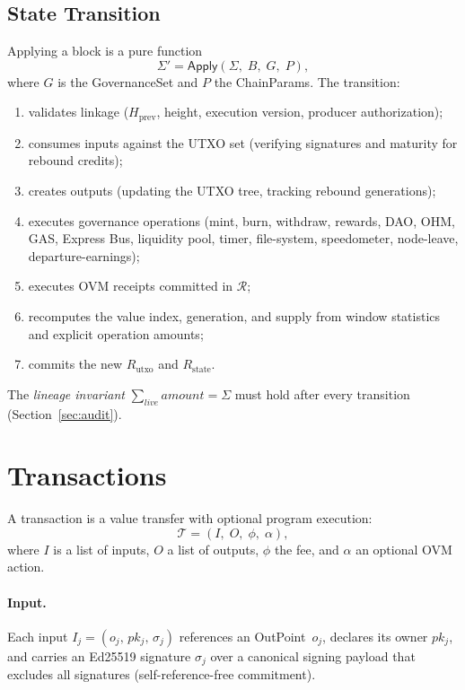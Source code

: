 \documentclass[11pt,a4paper]{article}
\theoremstyle{definition}
\newcommand{\outpoint}{\textsf{OutPoint}}
\begin{document}
\subsection{State Transition}

Applying a block is a pure function
\[
\Sigma' = \mathsf{Apply}(\Sigma,\; B,\; G,\; P),
\]
where $G$ is the GovernanceSet and $P$ the ChainParams.  The transition:
\begin{enumerate}[label=(\arabic*),leftmargin=2em]
  \item validates linkage ($H_{\mathrm{prev}}$, height, execution version,
    producer authorization);
  \item consumes inputs against the UTXO set (verifying signatures and
    maturity for rebound credits);
  \item creates outputs (updating the UTXO tree, tracking rebound generations);
  \item executes governance operations (mint, burn, withdraw, rewards, DAO,
    OHM, GAS, Express Bus, liquidity pool, timer, file-system, speedometer,
    node-leave, departure-earnings);
  \item executes OVM receipts committed in $\mathcal{R}$;
  \item recomputes the value index, generation, and supply from window
    statistics and explicit operation amounts;
  \item commits the new $R_{\mathrm{utxo}}$ and $R_{\mathrm{state}}$.
\end{enumerate}
The \emph{lineage invariant} $\sum_{\mathit{live}} \mathit{amount} = \Sigma$
must hold after every transition (Section~\ref{sec:audit}).

\section{Transactions}
\label{sec:tx}

A transaction is a value transfer with optional program execution:
\[
\mathcal{T} = (I,\; O,\; \phi,\; \alpha),
\]
where $I$ is a list of inputs, $O$ a list of outputs, $\phi$ the fee, and
$\alpha$ an optional OVM action.

\paragraph{Input.} Each input $I_j = (o_j,\, pk_j,\, \sigma_j)$ references an
\outpoint\ $o_j$, declares its owner $pk_j$, and carries an Ed25519 signature
$\sigma_j$ over a canonical signing payload that excludes all signatures
(self-reference-free commitment).
\end{document}

